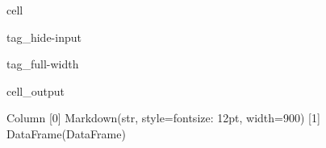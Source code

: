 \documentclass[letterpaper,10pt,english]{jupyterBook}
\begin{document}
\begin{sphinxuseclass}{cell}
\begin{sphinxuseclass}{tag_hide-input}
\begin{sphinxuseclass}{tag_full-width}\begin{sphinxVerbatimOutput}

\begin{sphinxuseclass}{cell_output}
\begin{sphinxVerbatim}[commandchars=\\\{\}]
Column
    [0] Markdown(str, style=\PYGZob{}\PYGZsq{}font\PYGZhy{}size\PYGZsq{}: \PYGZsq{}12pt\PYGZsq{}\PYGZcb{}, width=900)
    [1] DataFrame(DataFrame)
\end{sphinxVerbatim}

\end{sphinxuseclass}\end{sphinxVerbatimOutput}

\end{sphinxuseclass}
\end{sphinxuseclass}
\end{sphinxuseclass}
\end{document}

